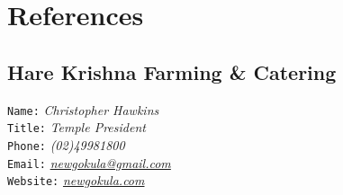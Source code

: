 \documentclass[12pt,a4paper,oneside]{article}
\begin{document}

\section{References}
\subsection{Hare Krishna Farming \& Catering}
\texttt{Name\phantom{...}:} \textit{\color{s}Christopher Hawkins}
\\\texttt{Title\phantom{..}:} \textit{\color{s}Temple President}
\\\texttt{Phone\phantom{..}:} \textit{\color{s}(02)49981800}
\\\texttt{Email\phantom{..}:} \textit{\color{s}\href{mailto:newgokula@gmail.com?Subject=Shyam}{newgokula@gmail.com}}
\\\texttt{Website:} \textit{\color{s}\href{http://www.newgokula.com/}{newgokula.com}}
\addtocounter{subsection}{1}
{}
\addtocounter{subsection}{-1}
\end{document}
